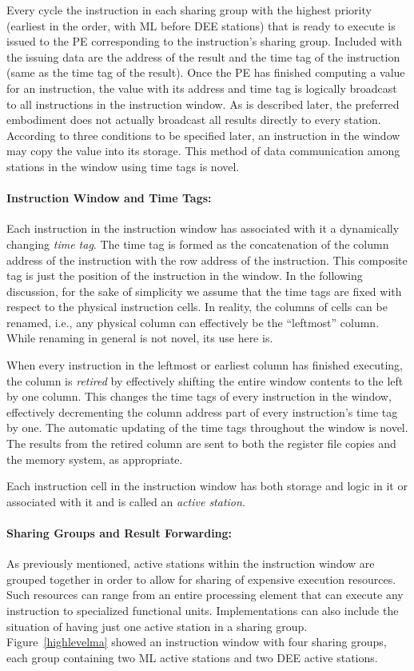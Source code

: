 \documentclass[10pt,dvips]{article}
\begin{document}
Every cycle the instruction in each sharing group
with the highest priority (earliest in
the order, with ML before DEE stations) that is ready to execute is issued to the
PE corresponding to the
instruction's sharing group.
Included with the issuing data are the address of the result and
the time tag of the instruction (same as the time tag of the result).
Once the PE has finished computing a value for an instruction, the value with
its address and time tag
is logically
broadcast to all instructions in the instruction window. As is described
later, the preferred embodiment does not actually broadcast all results
directly to every station.
According to three
conditions to be specified later, an instruction in the window may copy the
value into its storage. This method of data communication among
stations in the window using time tags is novel.

\paragraph{Instruction Window and Time Tags: }
Each instruction in the instruction window has associated with it a dynamically
changing  {\it time tag}. The time tag is formed as the concatenation of the
column address of the instruction with the row address of the instruction. This
composite tag is just the position of the instruction in the window.
In the following discussion, for the sake of simplicity we assume that
the time tags
are fixed with respect to the physical instruction cells. In reality, the columns
of cells can be renamed, i.e., any physical column can effectively be the ``leftmost''
column. While renaming in general is not novel, its use here is.

When every instruction in the leftmost or earliest column has finished executing,
the column is {\it retired} by effectively shifting the entire window contents
to the left by one column. This changes the time tags of every instruction in
the window, effectively decrementing the column address part of every instruction's
time tag by one. The automatic updating of the time tags throughout the window is
novel. The results from the retired column are sent to both the register
file copies and the memory system, as appropriate.

Each instruction cell in the instruction window has both storage and logic in
it or associated with it and is called an {\it active station}. 

\paragraph{Sharing Groups and Result Forwarding: }
As previously mentioned, active stations within the instruction
window are grouped together in
order to allow for sharing of expensive execution resources.  Such
resources can range from an entire processing element that
can execute any instruction to specialized functional units.
Implementations can also include the situation of having just one
active station in a sharing group.  Figure~\ref{highlevelma}
showed an instruction window with four sharing groups, each group
containing two ML active stations and two DEE active stations.
\end{document}
